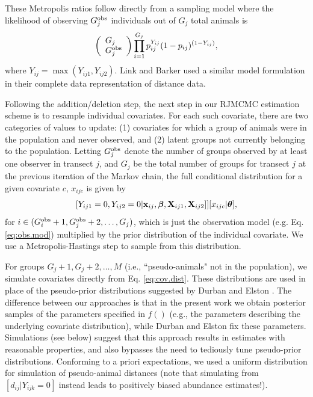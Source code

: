 \documentclass[10pt]{article}
\begin{document}
These Metropolis ratios follow directly from a sampling model where the likelihood of observing $G_j^{\rm obs}$ individuals out of $G_j$ total animals is
$$
\left( \begin{array}{l}
G_j \\
G_j^{\rm obs}
\end{array} \right)
\prod_{i=1}^{G_j} p_{ij}^{Y_{ij}} (1-p_{ij})^{(1-Y_{ij})},
$$
where $Y_{ij}=\max(Y_{ij1},Y_{ij2})$.  Link and Barker \cite{LinkBarker2010} used a similar model formulation in their complete data representation of distance data.

Following the addition/deletion step, the next step in our RJMCMC estimation scheme is to resample individual covariates.  For each such covariate, there are two categories of values to update: (1) covariates for which a group of animals were in the population and never observed, and (2) latent groups not currently belonging to the population. Letting $G_j^{\rm obs}$ denote the number of groups observed by at least one observer in transect $j$, and $G_j$ be the total number of groups for transect $j$ at the previous iteration of the Markov chain, the full conditional distribution for a given covariate $c$, $x_{ijc}$ is given by
$$
[Y_{ij1}=0,Y_{ij2}=0|{\bf x}_{ij},\boldsymbol{\beta},{\bf X}_{ij1},{\bf X}_{ij2}]][x_{ijc}|\boldsymbol{\theta}],
$$
for $i \in (G_i^{\rm obs}+1,G_{j}^{\rm obs}+2,\hdots,G_j)$,
which is just the observation model (e.g. Eq. \ref{eq:obs.mod}) multiplied by the prior distribution of the individual covariate.  We use a Metropolis-Hastings step to sample from this distribution.

For groups $G_j+1,G_j+2, \hdots,M$ (i.e., ``pseudo-animals" not in the population), we simulate covariates directly from Eq. \ref{eq:cov.dist}.  These distributions are used in place of the pseudo-prior distributions suggested by Durban and Elston \cite{DurbanElston2005}.  The difference between our approaches is that in the present work we obtain posterior samples of the parameters specified in  $f()$ (e.g., the parameters describing the underlying covariate distribution), while Durban and Elston fix these parameters.  Simulations (see below) suggest that this approach results in estimates with reasonable properties, and also bypasses the need to tediously tune pseudo-prior distributions.  Conforming to a priori expectations, we used a uniform distribution for simulation of pseudo-animal distances (note that simulating from $[d_{ij} | Y_{ijk}=0]$ instead leads to positively biased abundance estimates!).
\end{document}
